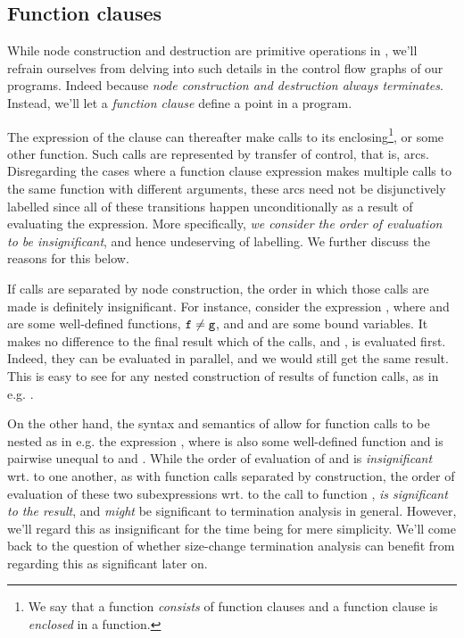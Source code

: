 

\subsection{Function clauses}

While node construction and destruction are primitive operations in \D{}, we'll
refrain ourselves from delving into such details in the control flow graphs of
our programs. Indeed because \emph{node construction and destruction always
terminates}. Instead, we'll let a \emph{function clause} define a point in a
program.

The expression of the clause can thereafter make calls to its
enclosing\footnote{We say that a function \emph{consists} of function clauses
and a function clause is \emph{enclosed} in a function.}, or some other
function. Such calls are represented by transfer of control, that is, arcs.
Disregarding the cases where a function clause expression makes multiple calls
to the same function with different arguments, these arcs need not be
disjunctively labelled since all of these transitions happen unconditionally as
a result of evaluating the expression. More specifically, \emph{we consider the
order of evaluation to be insignificant}, and hence undeserving of labelling.
We further discuss the reasons for this below.

If calls are separated by node construction, the order in which those calls are
made is definitely insignificant. For instance, consider the expression
, where  and  are some well-defined
functions, $\text{{\ttfamily f}}\neq\text{{\ttfamily g}}$, and  and  are
some bound variables. It makes no difference to the final result which of the
calls,  and , is evaluated first. Indeed, they can be
evaluated in parallel, and we would still get the same result. This is easy to
see for any nested construction of results of function calls, as in e.g.
.

On the other hand, the syntax and semantics of \D{} allow for function calls to
be nested as in e.g. the expression , where  is
also some well-defined function and is pairwise unequal to  and
. While the order of evaluation of  and  is
\emph{insignificant} wrt. to one another, as with function calls separated by
construction, the order of evaluation of these two subexpressions wrt. to the
call to function , \emph{is significant to the result}, and
\emph{might} be significant to termination analysis in general. However, we'll
regard this as insignificant for the time being for mere simplicity. We'll come
back to the question of whether size-change termination analysis can benefit
from regarding this as significant later on.

